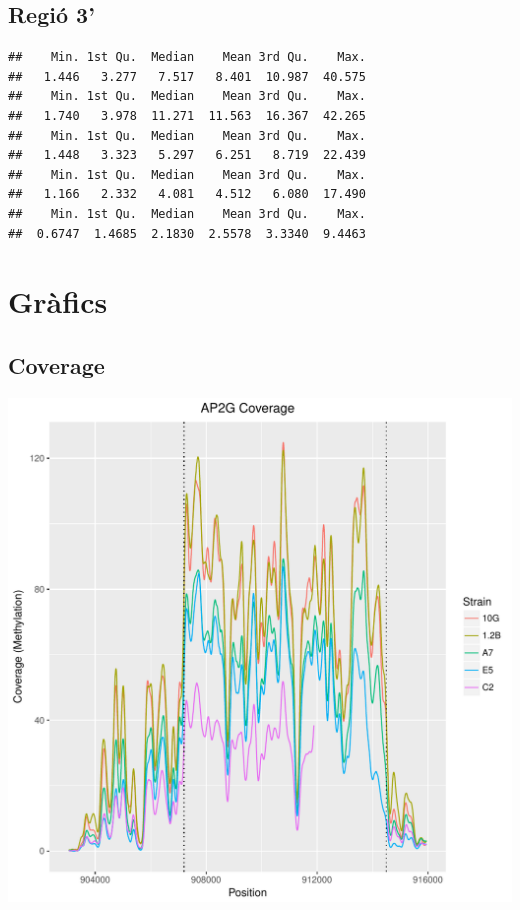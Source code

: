 \documentclass{article}\usepackage[]{graphicx}\usepackage[]{color}
\makeatletter
\newenvironment{kframe}{%
 \def\at@end@of@kframe{}%
 \ifinner\ifhmode%
  \def\at@end@of@kframe{\end{minipage}}%
  \begin{minipage}{\columnwidth}%
 \fi\fi%
 \def\FrameCommand##1{\hskip\@totalleftmargin \hskip-\fboxsep
 \colorbox{shadecolor}{##1}\hskip-\fboxsep
     \hskip-\linewidth \hskip-\@totalleftmargin \hskip\columnwidth}%
 \MakeFramed {\advance\hsize-\width
   \@totalleftmargin\z@ \linewidth\hsize
   \@setminipage}}%
 {\par\unskip\endMakeFramed%
 \at@end@of@kframe}
\newenvironment{knitrout}{}{} %
\makeatother
\begin{document}
\subsection{Regió 3'}
\begin{knitrout}
\color{fgcolor}\begin{kframe}
\begin{verbatim}
##    Min. 1st Qu.  Median    Mean 3rd Qu.    Max. 
##   1.446   3.277   7.517   8.401  10.987  40.575 
##    Min. 1st Qu.  Median    Mean 3rd Qu.    Max. 
##   1.740   3.978  11.271  11.563  16.367  42.265 
##    Min. 1st Qu.  Median    Mean 3rd Qu.    Max. 
##   1.448   3.323   5.297   6.251   8.719  22.439 
##    Min. 1st Qu.  Median    Mean 3rd Qu.    Max. 
##   1.166   2.332   4.081   4.512   6.080  17.490 
##    Min. 1st Qu.  Median    Mean 3rd Qu.    Max. 
##  0.6747  1.4685  2.1830  2.5578  3.3340  9.4463
\end{verbatim}
\end{kframe}
\end{knitrout}
\clearpage



\section{Gràfics}
\subsection{Coverage}
\begin{knitrout}
\color{fgcolor}
\includegraphics[width=1\linewidth]{figure/plot_coverage-1} 

\end{knitrout}
\clearpage
\end{document}
